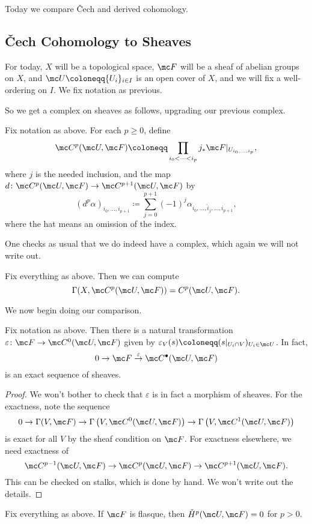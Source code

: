 \documentclass[../notes.tex]{subfiles}
\begin{document}
Today we compare \v Cech and derived cohomology.

\subsection{\v Cech Cohomology to Sheaves}
For today, $X$ will be a topological space, $\mc F$ will be a sheaf of abelian groups on $X$, and $\mc U\coloneqq\{U_i\}_{i\in I}$ is an open cover of $X$, and we will fix a well-ordering on $I$. We fix notation as previous.

So we get a complex on sheaves as follows, upgrading our previous complex.
\begin{defihelper} 
	Fix notation as above. For each $p\ge0$, define
	\[\mc C^p(\mc U,\mc F)\coloneqq\prod_{i_0<\cdots<i_p}j_*\mc F|_{U_{i_0,\ldots,i_p}},\]
	where $j$ is the needed inclusion, and the map $d\colon\mc C^p(\mc U,\mc F)\to\mc C^{p+1}(\mc U,\mc F)$ by
	\[(d^p\alpha)_{i_0,\ldots,i_{p+1}}\coloneqq\sum_{j=0}^{p+1}(-1)^j\alpha_{i_0,\ldots,\widehat i_j,\ldots,i_{p+1}},\]
	where the hat means an omission of the index.
\end{defihelper}
One checks as usual that we do indeed have a complex, which again we will not write out.
\begin{example}
	Fix everything as above. Then we can compute
	\[\Gamma(X,\mc C^p(\mc U,\mc F))=C^p(\mc U,\mc F).\]
\end{example}
We now begin doing our comparison.
\begin{lemma}
	Fix notation as above. Then there is a natural transformation $\varepsilon\colon\mc F\to\mc C^0(\mc U,\mc F)$ given by $\varepsilon_V(s)\coloneqq(s|_{U_i\cap V})_{U_i\in\mc U}$. In fact,
	\[0\to\mc F\stackrel\varepsilon\to\mc C^\bullet(\mc U,\mc F)\]
	is an exact sequence of sheaves.
\end{lemma}
\begin{proof}
	We won't bother to check that $\varepsilon$ is in fact a morphism of sheaves. For the exactness, note the sequence
	\[0\to\Gamma(V,\mc F)\to\Gamma\left(V,\mc C^0(\mc U,\mc F)\right)\to\Gamma\left(V,\mc C^1(\mc U,\mc F)\right)\]
	is exact for all $V$ by the sheaf condition on $\mc F$. For exactness elsewhere, we need exactness of
	\[\mc C^{p-1}(\mc U,\mc F)\to\mc C^{p}(\mc U,\mc F)\to\mc C^{p+1}(\mc U,\mc F).\]
	This can be checked on stalks, which is done by hand. We won't write out the details.
\end{proof}
\begin{proposition} \label{prop:flasque-zero-on-cech}
	Fix everything as above. If $\mc F$ is flasque, then $\check H^p(\mc U,\mc F)=0$ for $p>0$.
\end{proposition}
\end{document}

